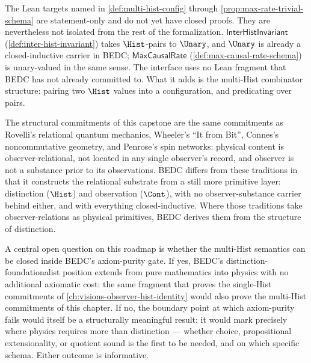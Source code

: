 \begin{remark}
\label{rem:relation-existing-lean}
The Lean targets named in \autoref{def:multi-hist-config} through \autoref{prop:max-rate-trivial-schema} are statement-only and do not yet have closed proofs. They are nevertheless not isolated from the rest of the formalization. \(\mathsf{InterHistInvariant}\) (\autoref{def:inter-hist-invariant}) takes \(\Hist\)-pairs to \(\Unary\), and \(\Unary\) is already a closed-inductive carrier in BEDC; \(\mathsf{MaxCausalRate}\) (\autoref{def:max-causal-rate-schema}) is unary-valued in the same sense. The interface uses no Lean fragment that BEDC has not already committed to. What it adds is the multi-Hist combinator structure: pairing two \(\Hist\) values into a configuration, and predicating over pairs.
\end{remark}

\begin{remark}
\label{rem:relational-physics}
The structural commitments of this capstone are the same commitments as Rovelli's relational quantum mechanics, Wheeler's ``It from Bit'', Connes's noncommutative geometry, and Penrose's spin networks: physical content is observer-relational, not located in any single observer's record, and observer is not a substance prior to its observations. BEDC differs from these traditions in that it constructs the relational substrate from a still more primitive layer: distinction (\(\Hist\)) and observation (\(\Cont\)), with no observer-substance carrier behind either, and with everything closed-inductive. Where those traditions take observer-relations as physical primitives, BEDC derives them from the structure of distinction.
\end{remark}

\begin{remark}
\label{rem:schema-only-axiom-purity}
A central open question on this roadmap is whether the multi-Hist semantics can be closed inside BEDC's axiom-purity gate. If yes, BEDC's distinction-foundationalist position extends from pure mathematics into physics with no additional axiomatic cost: the same fragment that proves the single-Hist commitments of \autoref{ch:visions-observer-hist-identity} would also prove the multi-Hist commitments of this chapter. If no, the boundary point at which axiom-purity fails would itself be a structurally meaningful result: it would mark precisely where physics requires more than distinction --- whether choice, propositional extensionality, or quotient sound is the first to be needed, and on which specific schema. Either outcome is informative.
\end{remark}

